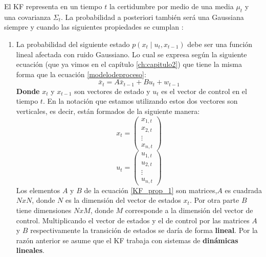El \ac{KF} representa en un tiempo $t$ la certidumbre por medio de una media $\mu_{t}$ y una covarianza $\Sigma_{t}$.
La probabilidad a posteriori también será una Gaussiana siempre y cuando las siguientes propiedades se cumplan \cite{thrun_probabilistic_2005}:
\begin{enumerate}
	\item La probabilidad del siguiente estado $p(x_{t} \mid u_{t},x_{t-1})$ debe ser una función lineal afectada con ruido Gaussiano. Lo cual se expresa según la siguiente ecuación (que ya vimos en el capítulo \ref{ch:capitulo2}) que tiene la misma forma que la ecuación \ref{modelodeproceso}:
    \begin{equation}\label{KF_prop_1}
\bar{x}_{t} = A\bar{x}_{t-1} + B u_{t} + w_{t-1} 
	\end{equation}
    \textbf{Donde} $x_{t}$ y $x_{t-1}$ son vectores de estado y $u_{t}$ es el vector de control en el tiempo $t$.
    En la notación que estamos utilizando estos dos vectores son verticales, es decir, están formados de la siguiente manera:
    \begin{equation}\label{vector_estados}
      x_{t} = 
      \left(
      \begin{array}{cccc}
      x_{1,t} \\
      x_{2,t} \\
      \vdots \\
      x_{n,t}
      \end{array}
      \right)
     \end{equation}
     \begin{equation} \label{Vector_control}
      u_{t} = 
      \left(
      \begin{array}{cccc}
      u_{1,t} \\
      u_{2,t} \\
      \vdots \\
      u_{n,t}
      \end{array}
      \right)
     \end{equation}
     Los elementos $A$ y $B$ de la ecuación \ref{KF_prop_1} son matrices,$A$ es cuadrada $NxN$, donde $N$ es la dimensión del vector de estados $x_{t}$.
     Por otra parte $B$ tiene dimensiones $NxM$, donde $M$ corresponde a la dimensión del vector de control.
     Multiplicando el vector de estados y el de control por las matrices $A$ y $B$ respectivamente la transición de estados se daría de forma \textbf{lineal}.
     Por la razón anterior se asume que el \ac{KF} trabaja con sistemas de \textbf{dinámicas lineales}.
     

\end{enumerate}
